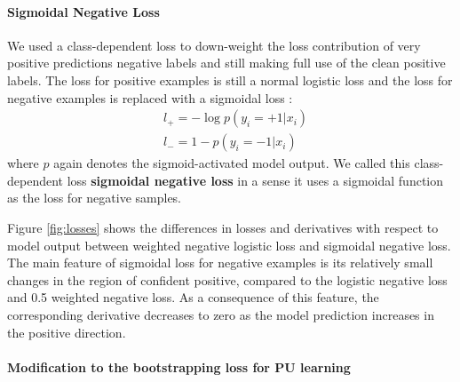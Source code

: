 \paragraph{Sigmoidal Negative Loss}

We used a class-dependent loss to down-weight the loss contribution of very positive predictions negative labels and still making full use of the clean positive labels.
The loss for positive examples is still a normal logistic loss and the loss for negative examples is replaced with a sigmoidal loss  \cite{tax2016class}:
\begin{equation*}
  \begin{aligned}
    & l_{+} = - \log p(y_i=+1 \vert x_i) \\
    & l_{-} = 1 - p(y_i=-1|x_i)
  \end{aligned}
\end{equation*}
where $p$ again denotes the sigmoid-activated model output.
We called this class-dependent loss \textbf{sigmoidal negative loss} in a sense it uses a sigmoidal function as the loss for negative samples.

Figure \ref{fig:losses} shows the differences in losses and derivatives with respect to model output between weighted negative logistic loss and sigmoidal negative loss.
The main feature of sigmoidal loss for negative examples is its relatively small changes in the region of confident positive, compared to the logistic negative loss and 0.5 weighted negative loss.
As a consequence of this feature, the corresponding derivative decreases to zero as the model prediction increases in the positive direction.


\paragraph{Modification to the bootstrapping loss for PU learning}

